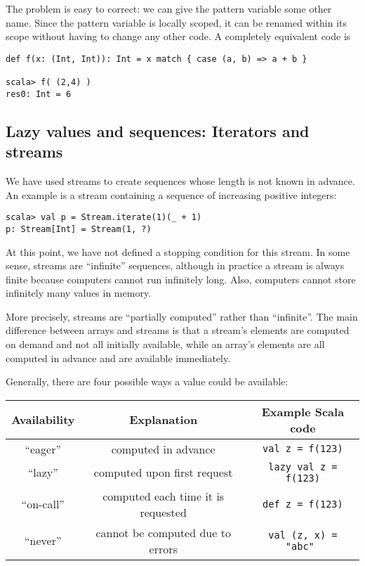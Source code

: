 The problem is easy to correct: we can give the pattern variable some
other name. Since the pattern variable is locally scoped, it can be
renamed within its scope without having to change any other code.
A completely equivalent code is
\begin{lstlisting}
def f(x: (Int, Int)): Int = x match { case (a, b) => a + b }

scala> f( (2,4) )
res0: Int = 6
\end{lstlisting}


\subsection{Lazy values and sequences: Iterators and streams\label{subsec:Lazy-values-iterators-and-streams}}

We have used streams to create sequences whose length is not known
in advance. An example is a stream containing a sequence of increasing
positive integers:
\begin{lstlisting}
scala> val p = Stream.iterate(1)(_ + 1)
p: Stream[Int] = Stream(1, ?)
\end{lstlisting}
At this point, we have not defined a stopping condition for this stream.
In some sense, streams are ``infinite'' sequences, although in practice
a stream is always finite because computers cannot run infinitely
long. Also, computers cannot store infinitely many values in memory. 

More precisely, streams are ``partially computed'' rather than ``infinite''.
The main difference between arrays and streams is that a stream's
elements are computed on demand and not all initially available, while
an array's elements are all computed in advance and are available
immediately.

Generally, there are four possible ways a value could be available:
\begin{center}
\begin{tabular}{|c|c|c|}
\hline 
\textbf{\small{}Availability} & \textbf{\small{}Explanation} & \textbf{\small{}Example Scala code}\tabularnewline
\hline 
\hline 
{\small{}``eager\index{eager value}''} & {\small{}computed in advance} & {\small{}}\lstinline!val z = f(123)!\tabularnewline
\hline 
{\small{}``lazy''} & {\small{}computed upon first request} & {\small{}}\lstinline!lazy val z = f(123)!\tabularnewline
\hline 
{\small{}``on-call''} & {\small{}computed each time it is requested} & {\small{}}\lstinline!def z = f(123)!\tabularnewline
\hline 
{\small{}``never''} & {\small{}cannot be computed due to errors} & {\small{}}\lstinline!val (z, x) = "abc" !\tabularnewline
\hline 
\end{tabular}
\par\end{center}

